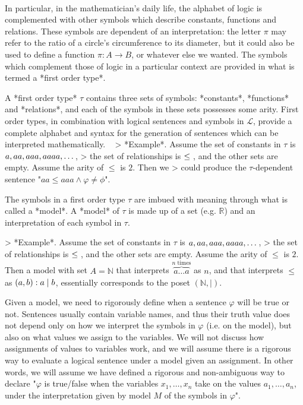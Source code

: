 \documentclass[a4paper, 12pt]{article}
\begin{document}
~ 

In particular, in the mathematician's daily life, the alphabet of logic is
complemented with other symbols which describe constants, functions and
relations. These symbols are dependent of an interpretation: the letter $\pi$
may refer to the ratio of a circle's circumference to its diameter, but it
could also be used to define a function $\pi : A \to B$, or whatever else we
wanted. The symbols which complement those of logic in a particular context 
are provided in what is termed a *first order type*.


A *first order type* $\tau$ contains three sets of symbols: *constants*,
*functions* and *relations*, and each of the symbols in these sets possesses
some arity. First order types, in combination with logical sentences and
symbols in $\mathcal{L}$, provide a complete alphabet and syntax for the
generation of sentences which can be interpreted mathematically. 
~
> *Example*. Assume the set of constants in $\tau$ is $\\{ a, aa, aaa, aaaa, \ldots \\}$,
> the set of relationships is $\\{ \leq \\}$, and the other sets are empty. Assume the 
arity of $\leq$ is $2$. Then we
> could produce the $\tau$-dependent sentence "$aa \leq aaa \land \varphi \neq \phi$".

The symbols in a first order type $\tau$ are imbued with meaning through what
is called a *model*. A *model* of $\tau$ is made up of a set (e.g. $\mathbb{R}$) and an
interpretation of each symbol in $\tau$.  

> *Example*. Assume the set of constants in $\tau$ is $\\{ a, aa, aaa, aaaa, \ldots \\}$,
> the set of relationships is $\\{ \leq \\}$, and the other sets are empty. Assume 
the arity of $\leq$ is $2$. Then a model with set $A = \mathbb{N}$
that interprets $\overbrace{a \ldots a}^{n \text{ times}}$ as $n$, and that interprets 
$\leq$ as $\\{ (a, b) : a \mid b \\}$, essentially corresponds to the poset $(\mathbb{N}, \mid)$.

Given a model, we need to rigorously define when a sentence $\varphi$ will be
true or not. Sentences usually contain variable names, and thus their truth value
does not depend only on how we interpret the symbols in $\varphi$ (i.e. on the
model), but also on what values we assign to the variables. We will not discuss
how assignments of values to variables work, and we will assume there is a
rigorous way to evaluate a logical sentence under a model given an assignment.
In other words, we will assume we have defined a rigorous and non-ambiguous way to declare 
"$\varphi$ is true/false when the variables $x_1, \ldots, x_n$ take on the values $a_1, \ldots, a_n$,
under the interpretation given by model $M$ of the symbols in $\varphi$".
\end{document}
